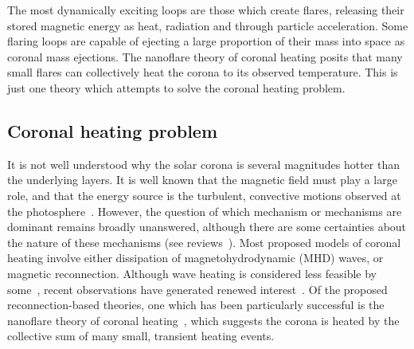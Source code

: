 The most dynamically exciting loops are those which create flares, releasing their stored magnetic energy as heat, radiation and through particle acceleration. Some flaring loops are capable of ejecting a large proportion of their mass into space as coronal mass ejections. The nanoflare theory of coronal heating posits that many small flares can collectively heat the corona to its observed temperature. This is just one theory which attempts to solve the coronal heating problem.

\subsection{Coronal heating problem}

It is not well understood why the solar corona is several magnitudes hotter than the underlying layers. It is well known that the magnetic field must play a large role, and that the energy source is the turbulent, convective motions observed at the photosphere~\cite{browningMechanismsSolarCoronal1991}. However, the question of which mechanism or mechanisms are dominant remains broadly unanswered, although there are some certainties about the nature of these mechanisms (see reviews~\cite{demoortelRecentAdvancesCoronal2015,realeCoronalLoopsObservations2014}). Most proposed models of coronal heating involve either dissipation of magnetohydrodynamic (MHD) waves, or magnetic reconnection. Although wave heating is considered less feasible by some~\cite{klimchukSolvingCoronalHeating2006a}, recent observations have generated renewed interest~\cite{hahnEvidenceWaveHeating2013,demoortelRecentAdvancesCoronal2015,mcintoshAlfvenicWavesSufficient2011,jessAlfvenWavesLower2009,depontieuChromosphericAlfvenicWaves2007}. Of the proposed reconnection-based theories, one which has been particularly successful is the nanoflare theory of coronal heating~\cite{klimchukSolvingCoronalHeating2006a}, which suggests the corona is heated by the collective sum of many small, transient heating events. 

